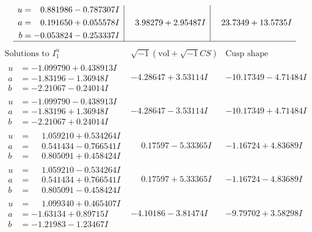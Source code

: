 \documentclass[1p]{elsarticle_modified}
\theoremstyle{definition}
\newcommand{\I}{\sqrt{-1}}
\begin{document}
$$\begin{array}{c|c|c}
\begin{aligned}
u &= \phantom{-}0.881986 - 0.787307 I \\
a &= \phantom{-}0.191650 + 0.055578 I \\
b &= -0.053824 - 0.253337 I\end{aligned}
 & \phantom{-}3.98279 + 2.95487 I & \phantom{-}23.7349 + 13.5735 I\\
 \hline 
 \end{array}$$\newpage$$\begin{array}{c|c|c}  
\text{Solutions to }I^u_{1}& \I (\text{vol} + \sqrt{-1}CS) & \text{Cusp shape}\\
 \hline 
\begin{aligned}
u &= -1.099790 + 0.438913 I \\
a &= -1.83196 - 1.36948 I \\
b &= -2.21067 - 0.24014 I\end{aligned}
 & -4.28647 + 3.53114 I & -10.17349 - 4.71484 I \\ \hline\begin{aligned}
u &= -1.099790 - 0.438913 I \\
a &= -1.83196 + 1.36948 I \\
b &= -2.21067 + 0.24014 I\end{aligned}
 & -4.28647 - 3.53114 I & -10.17349 + 4.71484 I \\ \hline\begin{aligned}
u &= \phantom{-}1.059210 + 0.534264 I \\
a &= \phantom{-}0.541434 - 0.766541 I \\
b &= \phantom{-}0.805091 + 0.458424 I\end{aligned}
 & \phantom{-}0.17597 - 5.33365 I & -1.16724 + 4.83689 I \\ \hline\begin{aligned}
u &= \phantom{-}1.059210 - 0.534264 I \\
a &= \phantom{-}0.541434 + 0.766541 I \\
b &= \phantom{-}0.805091 - 0.458424 I\end{aligned}
 & \phantom{-}0.17597 + 5.33365 I & -1.16724 - 4.83689 I \\ \hline\begin{aligned}
u &= \phantom{-}1.099340 + 0.465407 I \\
a &= -1.63134 + 0.89715 I \\
b &= -1.21983 - 1.23467 I\end{aligned}
 & -4.10186 - 3.81474 I & -9.79702 + 3.58298 I \\ \hline\begin{aligned}

\end{aligned}
\end{array}$$
\end{document}
